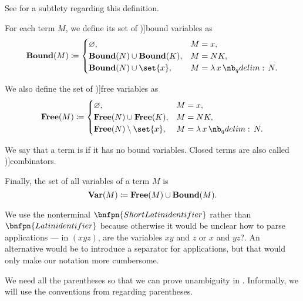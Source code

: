 \begin{definition}
\begin{thmenum}
    See  for a subtlety regarding this definition.

     For each term \( M \), we define its set of \term[ru=связанные (переменные) (\cite[188]{Герасимов2011})]{bound variables} as
    \begin{equation*}
      \boldop{Bound}(M) \coloneqq \begin{cases}
        \varnothing,                              &M = x, \\
        \boldop{Bound}(N) \cup \boldop{Bound}(K), &M = N K, \\
        \boldop{Bound}(N) \cup \set{ x },         &M = \qabs x N. \\
      \end{cases}
    \end{equation*}

     We also define the set of \term[ru=свободные (переменные) (\cite[189]{Герасимов2011})]{free variables} as
    \begin{equation*}
      \boldop{Free}(M) \coloneqq \begin{cases}
        \varnothing,                            &M = x, \\
        \boldop{Free}(N) \cup \boldop{Free}(K), &M = N K, \\
        \boldop{Free}(N) \setminus \set{ x },   &M = \qabs x N. \\
      \end{cases}
    \end{equation*}

     We say that a term is  if it has no bound variables. Closed terms are also called \term[ru=комбинаторы (\cite[188]{Герасимов2011})]{combinators}.

     Finally, the set of all variables of a term \( M \) is
    \begin{equation*}
      \operatorname{\mathbf{Var}}(M) \coloneqq \operatorname{\mathbf{Free}}(M) \cup \operatorname{\mathbf{Bound}}(M).
    \end{equation*}
  \end{thmenum}
\end{definition}
\begin{comments}
  \item We use the nonterminal \( \bnfpn{Short Latin identifier} \) rather than \( \bnfpn{Latin identifier} \) because otherwise it would be unclear how to parse applications --- in \( (xyz) \), are the variables \( xy \) and \( z \) or \( x \) and \( yz \)?. An alternative would be to introduce a separator for applications, but that would only make our notation more cumbersome.

  \item We need all the parentheses so that we can prove unambiguity in . Informally, we will use the conventions from  regarding parentheses.
\end{comments}

